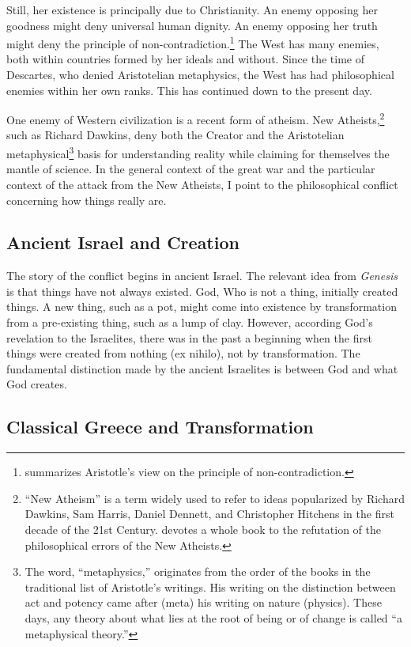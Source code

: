 \documentclass[twocolumn]{article}
\begin{document}
Still, her existence is principally due to Christianity.  An enemy opposing her
goodness might deny universal human dignity.  An enemy opposing her truth might
deny the principle of non-contradiction.\footnote{%
   \cite{go2015} summarizes Aristotle's view on the principle of
   non-contradiction.
}
The West has many enemies, both within countries formed by her ideals and
without.  Since the time of Descartes, who denied Aristotelian metaphysics, the
West has had philosophical enemies within her own ranks.  This has continued
down to the present day.

One enemy of Western civilization is a recent form of atheism.  New
Atheists,\footnote{%
   ``New Atheism'' is a term widely used to refer to ideas popularized by
   Richard Dawkins, Sam Harris, Daniel Dennett, and Christopher Hitchens in the
   first decade of the 21st Century.  \cite{f2008} devotes a whole book to the
   refutation of the philosophical errors of the New Atheists.
}
such as Richard Dawkins, deny both the Creator and the Aristotelian
metaphysical\footnote{%
   The word, ``metaphysics,'' originates from the order of the books in the
   traditional list of Aristotle's writings.  His writing on the distinction
   between act and potency came after (meta) his writing on nature (physics).
   These days, any theory about what lies at the root of being or of change is
   called ``a metaphysical theory.''%
}
basis for understanding reality while claiming for themselves the mantle of
science.  In the general context of the great war and the particular context of
the attack from the New Atheists, I point to the philosophical conflict
concerning how things really are.

\subsection{Ancient Israel and Creation}

The story of the conflict begins in ancient Israel.  The relevant idea from
{\it Genesis} is that things have not always existed.  God, Who is not a thing,
initially created things.  A new thing, such as a pot, might come into
existence by transformation from a pre-existing thing, such as a lump of clay.
However, according God's revelation to the Israelites, there was in the past a
beginning when the first things were created from nothing (ex nihilo), not by
transformation.  The fundamental distinction made by the ancient Israelites is
between God and what God creates.

\subsection{Classical Greece and Transformation}
\end{document}
